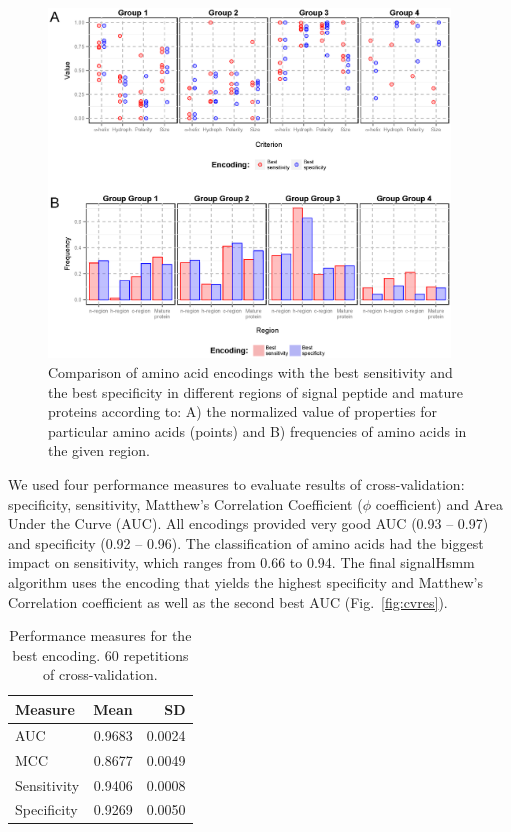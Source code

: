 \documentclass[fleqn,10pt,twoside]{gcb15submission}
\begin{document}
\begin{figure}[ht]\centering
\includegraphics[width=0.95\textwidth]{figures/enccomp.eps}
\caption{Comparison of amino acid encodings with the best sensitivity and the best
specificity in different regions of signal peptide and mature proteins according to: A) the normalized value of properties for particular amino acids (points) and B) frequencies of amino acids in the given region.}
\label{fig:enccomp}
\end{figure}

We used four performance measures to evaluate results of cross-validation: specificity, sensitivity, Matthew's Correlation Coefficient ($\phi$ coefficient) and Area Under the Curve (AUC). All encodings provided very good AUC (0.93 -- 0.97) and specificity (0.92 -- 0.96). The classification of amino acids had the biggest impact on sensitivity, which ranges from 0.66 to 0.94. The final signalHsmm algorithm uses the encoding that yields the highest specificity and Matthew's Correlation coefficient as well as the second best AUC (Fig.~\ref{fig:cvres}).

\begin{table}[ht]
\small
\centering
\caption{Performance measures for the best encoding. 60 repetitions of cross-validation.} 
\begin{tabular}{lrr}
  \toprule
Measure & Mean & SD \\ 
  \midrule
AUC & 0.9683 & 0.0024 \\ 
   \rowcolor[gray]{0.85}MCC & 0.8677 & 0.0049 \\ 
  Sensitivity & 0.9406 & 0.0008 \\ 
   \rowcolor[gray]{0.85}Specificity & 0.9269 & 0.0050 \\ 
   \bottomrule
\end{tabular}
\label{tab:perfmeas}
\end{table}
\end{document}
